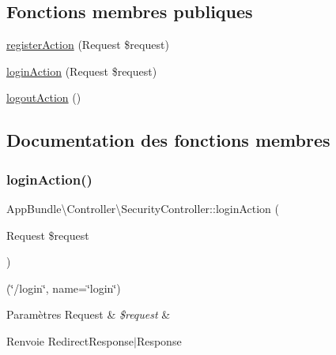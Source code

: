 \subsection*{Fonctions membres publiques}
\begin{DoxyCompactItemize}
\item 
\hyperlink{classAppBundle_1_1Controller_1_1SecurityController_ac211800b0754333fd74c47600d369aad}{register\+Action} (Request \$request)
\item 
\hyperlink{classAppBundle_1_1Controller_1_1SecurityController_a6a941512644667b9eed55538fc8934a8}{login\+Action} (Request \$request)
\item 
\hyperlink{classAppBundle_1_1Controller_1_1SecurityController_a8624fe4c796f910e349c874ff5d73ad2}{logout\+Action} ()
\end{DoxyCompactItemize}


\subsection{Documentation des fonctions membres}
\mbox{\label{classAppBundle_1_1Controller_1_1SecurityController_a6a941512644667b9eed55538fc8934a8}} 
\subsubsection{\texorpdfstring{login\+Action()}{loginAction()}}
{\footnotesize\ttfamily App\+Bundle\textbackslash{}\+Controller\textbackslash{}\+Security\+Controller\+::login\+Action (\begin{DoxyParamCaption}\item[{Request}]{\$request }\end{DoxyParamCaption})}

(\char`\"{}/login\char`\"{}, name=\char`\"{}login\char`\"{}) 
\begin{DoxyParams}[1]{Paramètres}
Request & {\em \$request} & \\
\hline
\end{DoxyParams}
\begin{DoxyReturn}{Renvoie}
Redirect\+Response$\vert$\+Response 
\end{DoxyReturn}
\mbox{\label{classAppBundle_1_1Controller_1_1SecurityController_a8624fe4c796f910e349c874ff5d73ad2}} 
